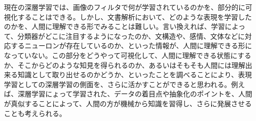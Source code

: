 現在の深層学習では、画像のフィルタで何が学習されているのかを、部分的に可視化することはできる。しかし、文書解析において、どのような表現を学習したのかを、人間に理解できる形でみることは難しい。言い換えれば、学習によって、分類器がどこに注目するようになったのか、文構造や、感情、文体などに対応するニューロンが存在しているのか、といった情報が、人間に理解できる形になっていない。この部分をどうやって可視化して、人間に理解できる状態にするか、そこからどのような知見を得られるのか、あるいはそもそも人間には理解出来る知識として取り出せるのかどうか、といったことを調べることにより、表現学習としての深層学習の側面を、さらに活かすことができると思われる。例えば、深層学習にょって学習された、データの着目点や抽象化のポイントを、人間が真似することによって、人間の方が機械から知識を習得し、さらに発展させることも考えられる。
